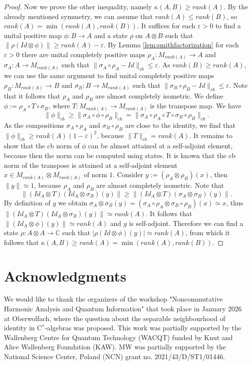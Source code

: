 \documentclass[11pt]{article}
\numberwithin{theorem}{section}
\begin{document}
\begin{proof}
Now we prove the other inequality, namely $\kappa(A,B) \geqslant rank(A)$. By the already mentioned symmetry, we can assume that $rank(A) \leqslant rank(B)$, so $rank(A) = \min(rank(A), rank(B))$. It suffices for each $\varepsilon > 0$ to find a unital positive map $\phi:B \to A$ and a state $\rho$ on $A\otimes B$ such that $\|\rho(Id \otimes \phi)\| \geqslant  rank(A) - \varepsilon$. By Lemma \ref{lem:smithfactorization} for each $\varepsilon > 0$ there are unital completely positive maps $\rho_{A}: M_{rank(A)} \to A$ and $\sigma_{A}: A \to M_{rank(A)}$ such that $\|\sigma_A\circ \rho_A - Id\|_{cb}\leqslant \varepsilon$. As $rank(B) \geqslant rank(A)$, we can use the same argument to find unital completely positive maps $\rho_{B}: M_{rank(A)} \to B$ and $\sigma_{B}: B \to M_{rank(A)}$ such that $\|\sigma_{B}\circ \rho_{B} - Id\|_{cb}\leqslant \varepsilon$. Note that it follows that $\rho_{A}$ and $\rho_B$ are almost completely isometric. We define $\phi:= \rho_{A}\circ T \circ \sigma_{B}$, where $T: M_{rank(A)} \to M_{rank(A)}$ is the transpose map. We have 
\[
\|\phi\|_{cb} \geqslant \|\sigma_{A} \circ \phi \circ \rho_{B}\|_{cb} = \|\sigma_{A} \circ \rho_{A}\circ T \circ \sigma_{B}\circ \rho_B\|_{cb}.
\]
As the compositions $\sigma_{A} \circ \rho_{A}$ and $\sigma_{B} \circ \rho_{B}$ are close to the identity, we find that $\|\phi\|_{cb} \geqslant rank(A)(1-\varepsilon)^2$, because $\|T\|_{cb} = rank(A)$. It remains to show that the cb norm of $\phi$ can be almost attained at a self-adjoint element, because then the norm can be computed using states. It is known that the cb norm of the transpose is attained at a self-adjoint element $x \in M_{rank(A)}\otimes M_{rank(A)}$ of norm $1$. Consider $y:= (\rho_{A} \otimes \rho_B)(x)$, then $\|y\|\simeq 1$, because $\rho_A$ and $\rho_{B}$ are almost completely isometric. Note that
\[
\|(Id_{A} \otimes T)(Id_{A}\otimes \sigma_B)(y)\| \geqslant \|(Id_{A} \otimes T)(\sigma_{A}\otimes \sigma_{B})(y)\|.
\]
By definition of $y$ we obtain $\sigma_{A}\otimes \sigma_{B}(y) = (\sigma_{A}\circ \rho_{A}\otimes \sigma_{B}\circ \rho_{B})(x) \simeq x$, thus $\|(Id_{A} \otimes T)(Id_{A}\otimes \sigma_B)(y)\| \simeq rank(A)$. It follows that $\|(Id_{A} \otimes \phi)(y)\| \simeq rank(A)$ and $y$ is self-adjoint. Therefore we can find a state $\rho: A \otimes A \to \mathbb{C}$ such that $|\rho(Id \otimes \phi)(y)| \simeq rank(A)$, from which it follows that $\kappa(A,B) \geqslant rank(A) = \min(rank(A), rank(B))$. 
\end{proof}

\section{Acknowledgments}
We would like to thank the organizers of the workshop "Noncommutative Harmonic Analysis and Quantum Information" that took place in January 2026 at Oberwolfach, where the question about the separable neighbourhood of identity in C$^*$-algebras was proposed. 
This work was partially supported by the Wallenberg Centre for Quantum Technology 
(WACQT) funded by Knut and Alice Wallenberg Foundation (KAW). MW was partially supported by the National Science Center, Poland (NCN) grant no. 2021/43/D/ST1/01446.
\end{document}
